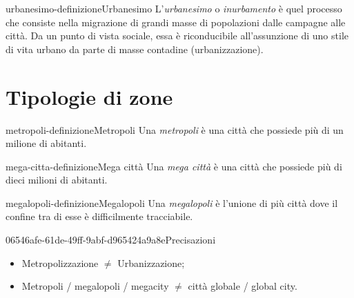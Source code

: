\documentclass[preview]{standalone}
\begin{document}
\begin{snippetdefinition}{urbanesimo-definizione}{Urbanesimo}
    L'\textit{urbanesimo} o \textit{inurbamento} è quel processo che consiste nella migrazione
    di grandi masse di popolazioni dalle campagne alle città.
    Da un punto di vista sociale, essa è riconducibile all'assunzione di uno stile
    di vita urbano da parte di masse contadine (urbanizzazione). 
\end{snippetdefinition}


\section{Tipologie di zone}

\begin{snippetdefinition}{metropoli-definizione}{Metropoli}
    Una \textit{metropoli} è una città che possiede più di un milione di abitanti.
\end{snippetdefinition}

\begin{snippetdefinition}{mega-citta-definizione}{Mega città}
    Una \textit{mega città} è una città che possiede più di dieci milioni di abitanti.
\end{snippetdefinition}

\begin{snippetdefinition}{megalopoli-definizione}{Megalopoli}
    Una \textit{megalopoli} è l'unione di più città dove il confine
    tra di esse è difficilmente tracciabile.
\end{snippetdefinition}


\begin{snippetnote}{06546afe-61de-49ff-9abf-d965424a9a8e}{Precisazioni}
    \begin{itemize}
        \item Metropolizzazione \(\neq\) Urbanizzazione;
        \item Metropoli / megalopoli / megacity \(\neq\) città globale / global
        city.
    \end{itemize}
\end{snippetnote}
\end{document}
